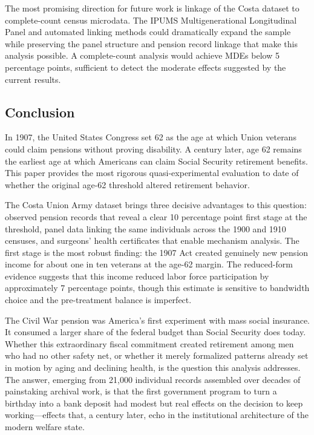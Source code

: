 \documentclass[12pt]{article}
\begin{document}
The most promising direction for future work is linkage of the Costa dataset to complete-count census microdata. The IPUMS Multigenerational Longitudinal Panel \citep{ruggles2024mlp} and automated linking methods \citep{abramitzky2021automated} could dramatically expand the sample while preserving the panel structure and pension record linkage that make this analysis possible. A complete-count analysis would achieve MDEs below 5 percentage points, sufficient to detect the moderate effects suggested by the current results.

\subsection{Conclusion}

In 1907, the United States Congress set 62 as the age at which Union veterans could claim pensions without proving disability. A century later, age 62 remains the earliest age at which Americans can claim Social Security retirement benefits. This paper provides the most rigorous quasi-experimental evaluation to date of whether the original age-62 threshold altered retirement behavior.

The Costa Union Army dataset brings three decisive advantages to this question: observed pension records that reveal a clear 10 percentage point first stage at the threshold, panel data linking the same individuals across the 1900 and 1910 censuses, and surgeons' health certificates that enable mechanism analysis. The first stage is the most robust finding: the 1907 Act created genuinely new pension income for about one in ten veterans at the age-62 margin. The reduced-form evidence suggests that this income reduced labor force participation by approximately 7 percentage points, though this estimate is sensitive to bandwidth choice and the pre-treatment balance is imperfect.

The Civil War pension was America's first experiment with mass social insurance. It consumed a larger share of the federal budget than Social Security does today. Whether this extraordinary fiscal commitment created retirement among men who had no other safety net, or whether it merely formalized patterns already set in motion by aging and declining health, is the question this analysis addresses. The answer, emerging from 21,000 individual records assembled over decades of painstaking archival work, is that the first government program to turn a birthday into a bank deposit had modest but real effects on the decision to keep working---effects that, a century later, echo in the institutional architecture of the modern welfare state.
\end{document}
